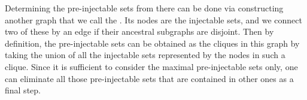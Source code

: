 Determining the pre-injectable sets from there can be done via constructing another graph that we call the . Its nodes are the injectable sets, and we connect two of these by an edge if their ancestral subgraphs are disjoint. Then by definition, the pre-injectable sets can be obtained as the cliques in this graph by taking the union of all the injectable sets represented by the nodes in such a clique. Since it is sufficient to consider the maximal pre-injectable sets only, one can eliminate all those pre-injectable sets that are contained in other ones as a final step.



